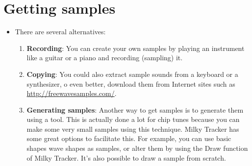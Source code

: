 \section{Getting samples}
\begin{itemize}
\item There are several alternatives:
  \begin{enumerate}
  \item \textbf{Recording}: You can create your own samples by playing
    an instrument like a guitar or a piano and recording (sampling)
    it.
  \item \textbf{Copying}: You could also extract sample sounds from a
    keyboard or a synthesizer, o even better, download them from
    Internet sites such as \url{http://freewavesamples.com/}.
  \item \textbf{Generating samples}: Another way to get samples is to
    generate them using a tool. This is actually done a lot for chip
    tunes because you can make some very small samples using this
    technique. Milky Tracker has some great options to facilitate
    this. For example, you can use basic shapes wave shapes as
    samples, or alter them by using the Draw function of Milky
    Tracker. It’s also possible to draw a sample from scratch.
  \end{enumerate}
\end{itemize}

